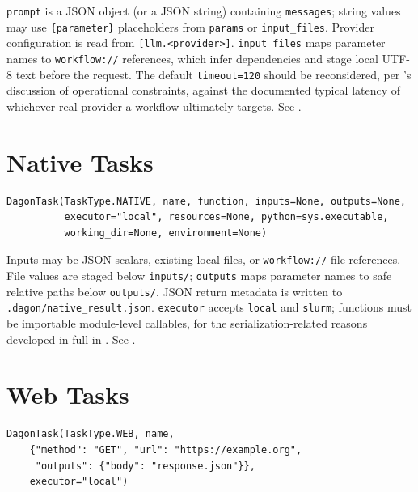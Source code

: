 \texttt{prompt} is a JSON object (or a JSON string) containing
\texttt{messages}; string values may use \texttt{\{parameter\}} placeholders
from \texttt{params} or \texttt{input\_files}. Provider configuration is read
from \texttt{[llm.<provider>]}. \texttt{input\_files} maps parameter names to
\texttt{workflow://} references, which infer dependencies and stage local
UTF-8 text before the request. The default \texttt{timeout=120} should be
reconsidered, per 's discussion of operational
constraints, against the documented typical latency of whichever real
provider a workflow ultimately targets. See .

\section{Native Tasks}

\begin{lstlisting}[caption={\texttt{NativeTask} constructor.}]
DagonTask(TaskType.NATIVE, name, function, inputs=None, outputs=None,
          executor="local", resources=None, python=sys.executable,
          working_dir=None, environment=None)
\end{lstlisting}

Inputs may be JSON scalars, existing local files, or \texttt{workflow://}
file references. File values are staged below \texttt{inputs/};
\texttt{outputs} maps parameter names to safe relative paths below
\texttt{outputs/}. JSON return metadata is written to
\texttt{.dagon/native\_result.json}. \texttt{executor} accepts
\texttt{local} and \texttt{slurm}; functions must be importable module-level
callables, for the serialization-related reasons developed in full in
. See .

\section{Web Tasks}

\begin{lstlisting}[caption={\texttt{WebTask} specification.}]
DagonTask(TaskType.WEB, name,
    {"method": "GET", "url": "https://example.org",
     "outputs": {"body": "response.json"}},
    executor="local")
\end{lstlisting}

